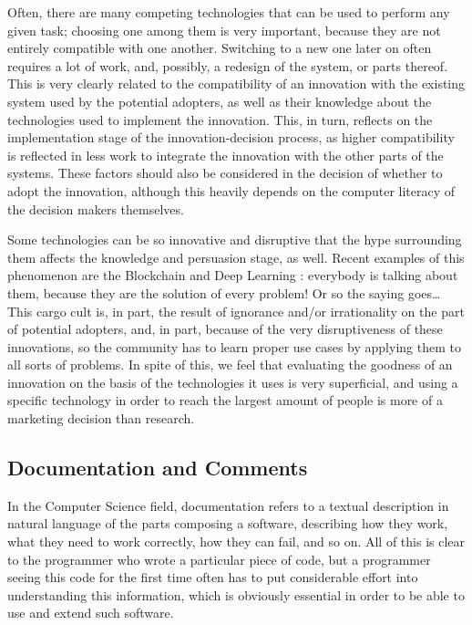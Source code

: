 \documentclass[12pt]{article}
\begin{document}
Often, there are many competing technologies that can be used to perform any given task; choosing one among them is very important, because they are not entirely compatible with one another. Switching to a new one later on often requires a lot of work, and, possibly, a redesign of the system, or parts thereof. This is very clearly related to the compatibility of an innovation with the existing system used by the potential adopters, as well as their knowledge about the technologies used to implement the innovation. This, in turn, reflects on the implementation stage of the innovation-decision process, as higher compatibility is reflected in less work to integrate the innovation with the other parts of the systems. These factors should also be considered in the decision of whether to adopt the innovation, although this heavily depends on the computer literacy of the decision makers themselves.

Some technologies can be so innovative and disruptive that the hype surrounding them affects the knowledge and persuasion stage, as well. Recent examples of this phenomenon are the Blockchain \citep{bitcoin} and Deep Learning \citep{imagenet}: everybody is talking about them, because they are the solution of every problem! Or so the saying goes\ldots{} This cargo cult is, in part, the result of ignorance and/or irrationality on the part of potential adopters, and, in part, because of the very disruptiveness of these innovations, so the community has to learn proper use cases by applying them to all sorts of problems. In spite of this, we feel that evaluating the goodness of an innovation on the basis of the technologies it uses is very superficial, and using a specific technology in order to reach the largest amount of people is more of a marketing decision than research.

\subsection{Documentation and Comments}
\label{sec:orgb37ffc6}
In the Computer Science field, documentation refers to a textual description in natural language of the parts composing a software, describing how they work, what they need to work correctly, how they can fail, and so on. All of this is clear to the programmer who wrote a particular piece of code, but a programmer seeing this code for the first time often has to put considerable effort into understanding this information, which is obviously essential in order to be able to use and extend such software.
\end{document}
